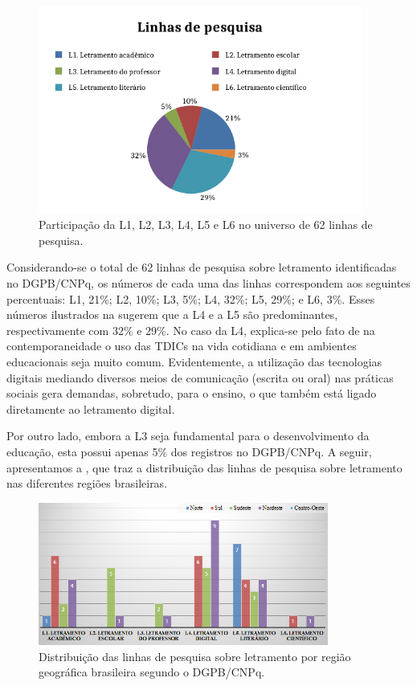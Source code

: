 \documentclass{textolivre}
\begin{document}
\begin{figure}[htbp]
 \centering
 \includegraphics[width=0.95\textwidth]{Fig01_pt.pdf}
 \caption{Participação da L1, L2, L3, L4, L5 e L6 no universo de 62 linhas de pesquisa.}
 \label{fig01}
\end{figure}


Considerando-se o total de 62 linhas de pesquisa sobre letramento identificadas no DGPB/CNPq, os números de cada uma das linhas correspondem aos seguintes percentuais: L1, 21\%; L2, 10\%; L3, 5\%; L4, 32\%; L5, 29\%; e L6, 3\%. Esses números ilustrados na  sugerem que a L4 e a L5 são predominantes, respectivamente com 32\% e 29\%. No caso da L4, explica-se pelo fato de na contemporaneidade o uso das TDICs na vida cotidiana e em ambientes educacionais seja muito comum. Evidentemente, a utilização das tecnologias digitais mediando diversos meios de comunicação (escrita ou oral) nas práticas sociais gera demandas, sobretudo, para o ensino, o que também está ligado diretamente ao letramento digital. 

Por outro lado, embora a L3 seja fundamental para o desenvolvimento da educação, esta possui apenas 5\% dos registros no DGPB/CNPq. A seguir, apresentamos a , que traz a distribuição das linhas de pesquisa sobre letramento nas diferentes regiões brasileiras.

\begin{figure}[htbp]
 \centering
 \includegraphics[width=0.85\textwidth]{Fig02_pt.png}
 \caption{Distribuição das linhas de pesquisa sobre letramento por região geográfica brasileira segundo o DGPB/CNPq.}
 \label{fig02}
\end{figure}
\end{document}
